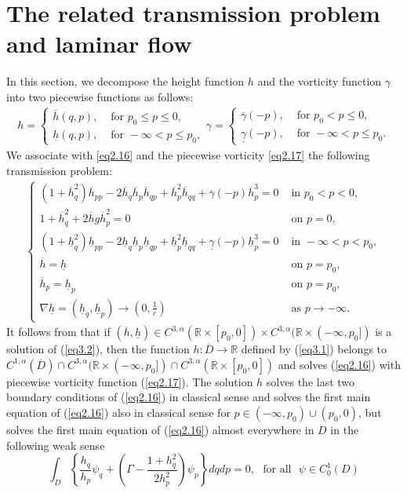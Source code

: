 \documentclass[11pt,reqno]{amsart}
\numberwithin{equation}{section}
\theoremstyle{definition}
\theoremstyle{remark}
\begin{document}
\section{The related transmission problem and laminar flow}
In this section, we decompose the height function $h$ and the vorticity
function $\gamma$ into two piecewise functions as follows:
\begin{eqnarray}
h=\left\{\begin{array}{ll}{\overline{h}(q,p)},  & {\text { for } p_0\leq p\leq0}, \\
{\underline{h}(q,p)}, & {\text { for } -\infty<p\leq
p_0},\end{array}\right.
\gamma=\left\{\begin{array}{ll}{\overline{\gamma}(-p)},  & {\text { for } p_0<p\leq0}, \\
{\underline{\gamma}(-p)}, & {\text { for } -\infty<p\leq
p_0}.\end{array}\right. \label{eq3.1}
\end{eqnarray}
We associate with \eqref{eq2.16} and the piecewise vorticity
\eqref{eq2.17} the following transmission problem:
\begin{eqnarray}
\left\{\begin{array}{lll}
{\left(1+\overline{h}_{q}^{2}\right) \overline{h}_{p p}-2 \overline{h}_{q} \overline{h}_{p} \overline{h}_{q p}+\overline{h}_{p}^{2} \overline{h}_{q q}+\overline{\gamma}(-p)\overline{h}_{p}^{3}}=0  & {\text { in } p_0<p<0}, \\
{1+\overline{h}_{q}^{2}+2\overline{h}g\overline{h}_{p}^{2}=0} & {\text { on } p=0}, \\
{\left(1+\underline{h}_{q}^{2}\right) \underline{h}_{p p}-2 \underline{h}_{q} \underline{h}_{p} \underline{h}_{q p}+\underline{h}_{p}^{2} \underline{h}_{q q}+\underline{\gamma}(-p)\underline{h}_{p}^{3}}=0  & {\text { in } -\infty<p<p_0}, \\
{\overline{h}=\underline{h}} & {\text { on } p=p_0}, \\
{\overline{h}_p=\underline{h}_p} & {\text { on } p=p_0}, \\
{\nabla \underline{h}=(\underline{h}_q, \underline{h}_p)\rightarrow
(0, \frac{1}{c})} & {\text { as } p\rightarrow
-\infty}.\end{array}\right. \label{eq3.2}
\end{eqnarray}
It follows from \cite{MartinM} that if
$(\overline{h},\underline{h})\in
C^{3,\alpha}(\mathbb{R}\times[p_0,0])\times
C^{3,\alpha}(\mathbb{R}\times(-\infty,p_0])$ is a solution of
(\ref{eq3.2}), then the function $h: \overline{D}\rightarrow
\mathbb{R}$ defined by (\ref{eq3.1}) belongs to
$C^{1,\alpha}(\overline{D})\cap
C^{3,\alpha}(\mathbb{R}\times(-\infty,p_0])\cap
C^{3,\alpha}(\mathbb{R}\times[p_0,0])$ and solves (\ref{eq2.16})
with piecewise vorticity function (\ref{eq2.17}). The solution $h$
solves the last two boundary conditions of (\ref{eq2.16}) in
classical sense and solves the first main equation of (\ref{eq2.16})
also in classical sense for $p\in(-\infty,p_0)\cup(p_0,0)$, but
solves the first main equation of (\ref{eq2.16}) almost everywhere
in $D$ in the following weak sense
$$
\int_{D}\left\{\frac{h_q}{h_p}\psi_q+
\left(\Gamma-\frac{1+h_q^2}{2h_p^2}\right)\psi_p\right\}dqdp=0,
~~~\text{for~all}~~~\psi\in C_0^1(D)
$$
\end{document}
